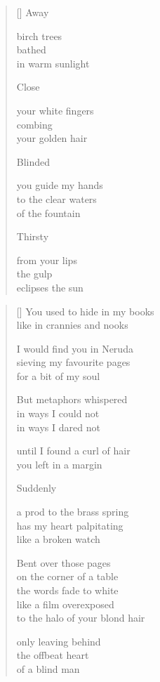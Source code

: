 \documentclass[12pt,a4paper]{article}
\begin{document}
\begin{verse}[\versewidth]
  Away

  birch trees \\
  bathed \\
  in warm sunlight

  Close

  your white fingers \\
  combing \\
  your golden hair

  Blinded

  you guide my hands \\
  to the clear waters \\
  of the fountain

  Thirsty

  from your lips \\
  the gulp \\
  eclipses the sun
\end{verse}


\newpage

\poemtitle{}

\settowidth{\versewidth}{to the halo of your blond hair}

\bigskip

\begin{verse}[\versewidth]
  You used to hide in my books \\
  like in crannies and nooks

  I would find you in Neruda \\
  sieving my favourite pages \\
  for a bit of my soul

  But metaphors whispered \\
  in ways I could not \\
  in ways I dared not

  until I found a curl of hair \\
  you left in a margin

  Suddenly

  a prod to the brass spring \\
  has my heart palpitating \\
  like a broken watch

  Bent over those pages \\
  on the corner of a table \\
  the words fade to white \\
  like a film overexposed \\
  to the halo of your blond hair

  only leaving behind \\
  the offbeat heart \\
  of a blind man
\end{verse}
\end{document}
